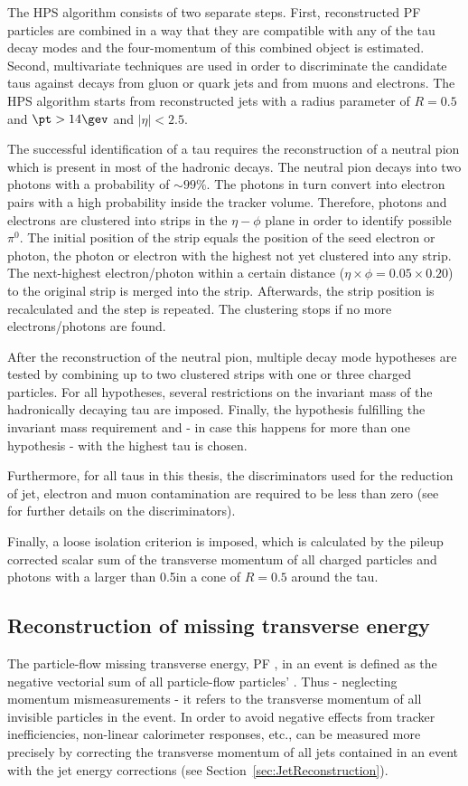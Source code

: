 The HPS algorithm consists of two separate steps. 
First, reconstructed PF particles are combined in a way that they are compatible with any of the tau decay modes and the four-momentum of this combined object is estimated.
Second, multivariate techniques are used in order to discriminate the candidate taus against decays from gluon or quark jets and from muons and electrons. 
The HPS algorithm starts from reconstructed jets with a radius parameter of $R=0.5$ and $\pt>14\gev$ and $|\eta|<2.5$.

The successful identification of a tau requires the reconstruction of a neutral pion which is present in most of the hadronic decays.
The neutral pion decays into two photons with a probability of $\sim 99\%$. 
The photons in turn convert into electron pairs with a high probability inside the tracker volume.
Therefore, photons and electrons are clustered into strips in the $\eta-\phi$ plane in order to identify possible $\pi^0$.
The initial position of the strip equals the position of the seed electron or photon, \ie the photon or electron with the highest \pt not yet clustered into any strip.
The next-highest \pt electron/photon within a certain distance ($\eta \times \phi = 0.05 \times 0.20$) to the original strip is merged into the strip.
Afterwards, the strip position is recalculated and the step is repeated.
The clustering stops if no more electrons/photons are found.

After the reconstruction of the neutral pion, multiple decay mode hypotheses are tested by combining up to two clustered strips with one or three charged particles.
For all hypotheses, several restrictions on the invariant mass of the hadronically decaying tau are imposed.
Finally, the hypothesis fulfilling the invariant mass requirement and - in case this happens for more than one hypothesis - with the highest \pt tau is chosen.

Furthermore, for all taus in this thesis, the discriminators used for the reduction of jet, electron and muon contamination are required to be less than zero (see~\cite{bib:CMS:TauReconstruction_8TeV} for further details on the discriminators).

Finally, a loose isolation criterion is imposed, which is calculated by the pileup corrected scalar sum of the transverse momentum of all charged particles and photons with a \pt larger than 0.5\gev in a cone of $R=0.5$ around the tau.

\subsection{Reconstruction of missing transverse energy}
The particle-flow missing transverse energy, PF \met, in an event is defined as the negative vectorial sum of all particle-flow particles' \pt.
Thus - neglecting momentum mismeasurements - it refers to the transverse momentum of all invisible particles in the event.
In order to avoid negative effects from \eg tracker inefficiencies, non-linear calorimeter responses, etc., \met can be measured more precisely by correcting the transverse momentum of all jets contained in an event with the jet energy corrections (see Section~\ref{sec:JetReconstruction}).

